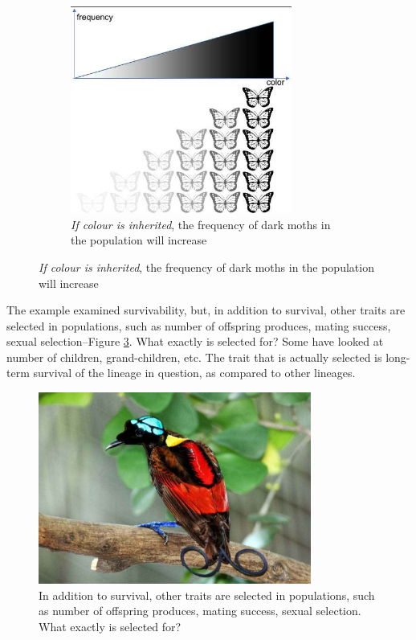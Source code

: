 \documentclass[]{article}
\begin{document}
\begin{figure}[H]
\begin{subfigure}[t]{0.3\textwidth}
	\end{subfigure}
	\;\;\;
	\begin{subfigure}[t]{0.3\textwidth}
		\caption{ \emph{ If colour is inherited}, the frequency of dark moths in the population will increase}\label{fig:SelectionMoths2}
		\includegraphics[width=0.8\textwidth]{SelectionMoths2}
	\end{subfigure}
\end{figure}

The example examined survivability, but, in addition to survival, other traits are selected in populations, such as number of offspring produces, mating success, sexual selection--Figure \ref{fig:BrightBird}. What exactly is selected for? Some have looked at number of children, grand-children, etc. The trait that is actually selected is long-term survival of the lineage in question, as compared to other lineages.

\begin{figure}[H]
	\caption[What exactly is selected for?]{In addition to survival, other traits are selected in populations, such as number of offspring produces, mating success, sexual selection. What exactly is selected for?}\label{fig:BrightBird}
	\includegraphics[width=0.8\textwidth]{BrightBird}
\end{figure}
\end{document}
